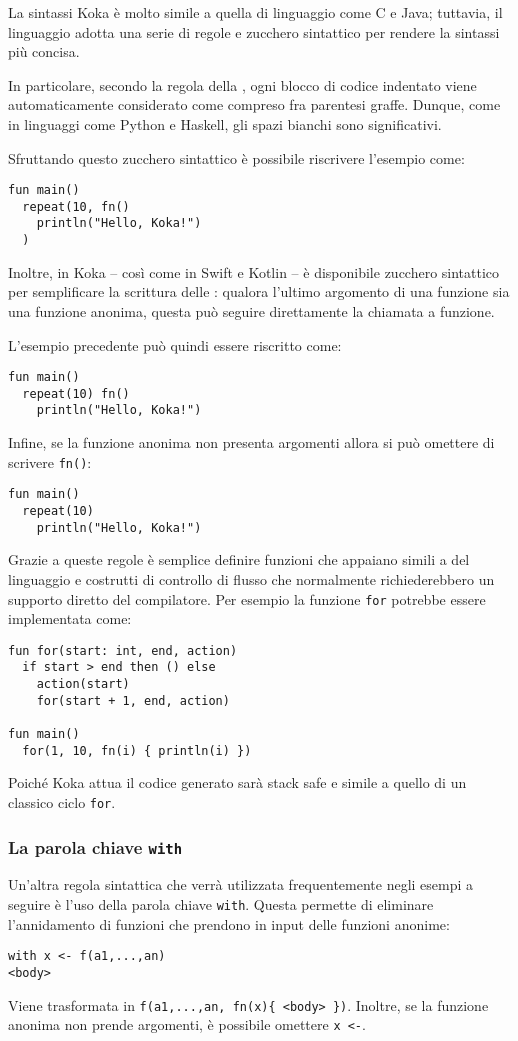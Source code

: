 La sintassi Koka è molto simile a quella di linguaggio come C e Java; tuttavia, il linguaggio adotta una serie di regole e zucchero sintattico per rendere la sintassi più concisa.

In particolare, secondo la regola della , ogni blocco di codice indentato viene automaticamente considerato come compreso fra parentesi graffe. Dunque, come in linguaggi come Python e Haskell, gli spazi bianchi sono significativi.

Sfruttando questo zucchero sintattico è possibile riscrivere l'esempio come:
\begin{lstlisting}[language=koka]
fun main()
  repeat(10, fn()
    println("Hello, Koka!")
  )
\end{lstlisting}

Inoltre, in Koka -- così come in Swift e Kotlin -- è disponibile zucchero sintattico per semplificare la scrittura delle : qualora l'ultimo argomento di una funzione sia una funzione anonima, questa può seguire direttamente la chiamata a funzione.

L'esempio precedente può quindi essere riscritto come:
\begin{lstlisting}[language=koka]
fun main()
  repeat(10) fn()
    println("Hello, Koka!")
\end{lstlisting}
Infine, se la funzione anonima non presenta argomenti allora si può omettere di scrivere \lstinline{fn()}:
\begin{lstlisting}[language=koka]
fun main()
  repeat(10)
    println("Hello, Koka!")
\end{lstlisting}
Grazie a queste regole è semplice definire funzioni che appaiano simili a  del linguaggio e costrutti di controllo di flusso che normalmente richiederebbero un supporto diretto del compilatore.
Per esempio la funzione \lstinline{for} potrebbe essere implementata come:
\begin{lstlisting}[language=koka]
fun for(start: int, end, action)
  if start > end then () else
    action(start)
    for(start + 1, end, action)

fun main()
  for(1, 10, fn(i) { println(i) })
\end{lstlisting}
Poiché Koka attua  il codice generato sarà stack safe e simile a quello di un classico ciclo \lstinline{for}.

\subsubsection{La parola chiave \lstinline{with}}
Un'altra regola sintattica che verrà utilizzata frequentemente negli esempi a seguire è l'uso della parola chiave \lstinline{with}. Questa permette di eliminare l'annidamento di funzioni che prendono in input delle funzioni anonime:
\begin{lstlisting}
with x <- f(a1,...,an)
<body>
\end{lstlisting}
Viene trasformata in \lstinline|f(a1,...,an, fn(x){ <body> })|. Inoltre, se la funzione anonima non prende argomenti, è possibile omettere \lstinline{x <-}.

